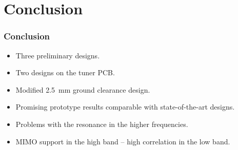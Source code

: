 \section{Conclusion}
\begin{frame}
  \frametitle{Conclusion}
      \begin{itemize}
      \item Three preliminary designs.
      \item Two designs on the tuner PCB.
      \item Modified \SI{2.5}{mm} ground clearance design.
    \item Promising prototype results comparable with state-of-the-art designs.
    \item Problems with the resonance in the higher frequencies.
    \item MIMO support in the high band -- high correlation in the low band.
      \end{itemize}
\end{frame}

